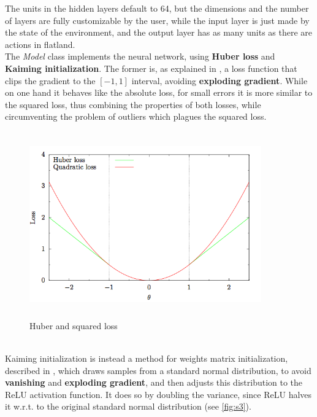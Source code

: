 \noindent 
The units in the hidden layers default to 64, but the dimensions and the number of layers are fully customizable by the user, while the input layer is just made by the state of the environment, and the output layer has as many units as there are actions in flatland. \\ The \textit{Model} class implements the neural network, using \textbf{Huber loss} and \textbf{Kaiming initialization}. The former is, as explained in \cite{huber}, a loss function that clips the gradient to the $[-1,1]$ interval, avoiding \textbf{exploding gradient}. While on one hand it behaves like the absolute loss, for small errors it is more similar to the squared loss, thus combining the properties of both losses, while circumventing the problem of outliers which plagues the squared loss.\\
\begin{figure}[H] 
\includegraphics[height=80mm, width=100mm, scale=0.5]{figures/huber.png}
\centering
\caption{Huber and squared loss}
\label{fig:s2} 
\end{figure}
\noindent
 \\ Kaiming initialization is instead a method for weights matrix initialization, described in \cite{kaiming}, which draws samples from a standard normal distribution, to avoid \textbf{vanishing} and \textbf{exploding gradient}, and then adjusts this distribution to the ReLU activation function. It does so by doubling the variance, since ReLU halves it w.r.t. to the original standard normal distribution (see \ref{fig:s3}).
 
